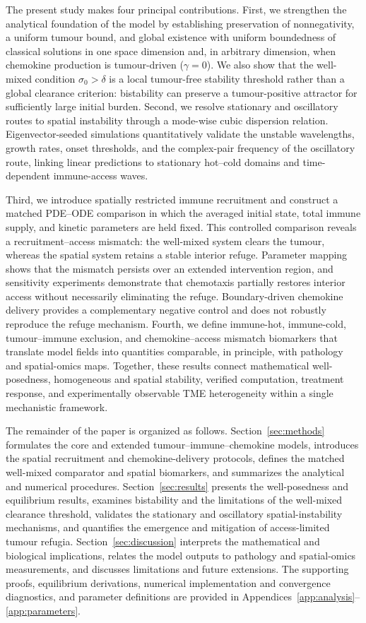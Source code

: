 \documentclass[]{interact}
\theoremstyle{plain}%
\theoremstyle{definition}
\theoremstyle{remark}
\begin{document}
The present study makes four principal contributions. First, we strengthen the analytical foundation of the model by establishing preservation of nonnegativity, a uniform tumour bound, and global existence with uniform boundedness of classical solutions in one space dimension and, in arbitrary dimension, when chemokine production is tumour-driven ($\gamma=0$). We also show that the well-mixed condition $\sigma_0>\delta$ is a local tumour-free stability threshold rather than a global clearance criterion: bistability can preserve a tumour-positive attractor for sufficiently large initial burden. Second, we resolve stationary and oscillatory routes to spatial instability through a mode-wise cubic dispersion relation. Eigenvector-seeded simulations quantitatively validate the unstable wavelengths, growth rates, onset thresholds, and the complex-pair frequency of the oscillatory route, linking linear predictions to stationary hot--cold domains and time-dependent immune-access waves.

Third, we introduce spatially restricted immune recruitment and construct a matched PDE--ODE comparison in which the averaged initial state, total immune supply, and kinetic parameters are held fixed. This controlled comparison reveals a recruitment--access mismatch: the well-mixed system clears the tumour, whereas the spatial system retains a stable interior refuge. Parameter mapping shows that the mismatch persists over an extended intervention region, and sensitivity experiments demonstrate that chemotaxis partially restores interior access without necessarily eliminating the refuge. Boundary-driven chemokine delivery provides a complementary negative control and does not robustly reproduce the refuge mechanism. Fourth, we define immune-hot, immune-cold, tumour--immune exclusion, and chemokine--access mismatch
biomarkers that translate model fields into quantities comparable, in principle, with pathology and spatial-omics maps. Together, these results connect mathematical well-posedness, homogeneous and spatial stability, verified computation, treatment response, and experimentally observable TME heterogeneity within a single mechanistic framework.

The remainder of the paper is organized as follows. Section~\ref{sec:methods} formulates the core and extended tumour--immune--chemokine models, introduces the spatial recruitment and chemokine-delivery protocols, defines the matched well-mixed comparator and spatial biomarkers, and summarizes the analytical and numerical procedures. Section~\ref{sec:results} presents the well-posedness and equilibrium results, examines bistability and the limitations of the well-mixed clearance threshold, validates the stationary and oscillatory spatial-instability mechanisms, and quantifies the emergence and mitigation of access-limited tumour refugia. Section~\ref{sec:discussion} interprets the mathematical and biological implications, relates the model outputs to pathology and spatial-omics measurements, and discusses limitations and future extensions. The supporting proofs, equilibrium derivations, numerical implementation and convergence diagnostics, and parameter definitions are provided in Appendices~\ref{app:analysis}--\ref{app:parameters}.
\end{document}
